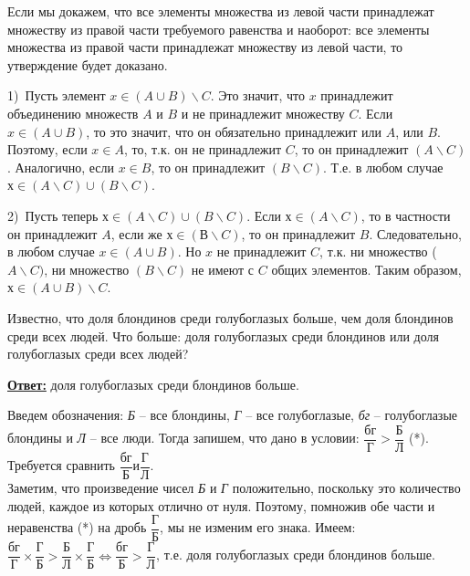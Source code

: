 \begin{prf}
Если мы докажем, что все элементы множества из левой части принадлежат множеству из правой части требуемого равенства и наоборот: все элементы множества из правой части принадлежат множеству из левой части, то утверждение будет доказано.

1)~Пусть элемент $x \in (A \cup B) \backslash C$. Это значит, что $x$ принадлежит объединению множеств $A$ и $B$ и не принадлежит множеству $C$. Если $x \in (A \cup B)$, то это значит, что он обязательно принадлежит или $A$, или $B$. Поэтому, если $x \in A$, то, т.к. он не принадлежит $C$, то он принадлежит $(A \backslash C)$. Аналогично, если $x \in B$, то он принадлежит $(B \backslash C)$. Т.е. в любом случае $х \in (A \backslash C) \cup (B \backslash C)$.

2)~Пусть теперь $х \in (A \backslash C) \cup (B \backslash C)$. Если $х \in (A \backslash C)$, то в частности он принадлежит $A$, если же $х \in (В \backslash C)$, то он принадлежит $B$. Следовательно, в любом случае $x \in (A \cup B)$. Но $x$ не принадлежит $C$, т.к. ни множество ($A \backslash C)$, ни множество $(B \backslash C)$ не имеют с $C$ общих элементов. Таким образом, $х \in (A \cup B) \backslash C$. 
\end{prf}

\begin{thm} 
Известно, что доля блондинов среди голубоглазых больше, чем доля блондинов среди всех людей. Что больше: доля голубоглазых среди блондинов или доля голубоглазых среди всех людей?
\end{thm}
\par
\textbf{\underline{Ответ:}} доля голубоглазых среди блондинов больше.

\begin{prf}
Введем обозначения: \textit{Б} – все блондины, \textit{Г} – все голубоглазые, \textit{бг} – голубоглазые блондины и \textit{Л} – все люди. Тогда запишем, что дано в условии: $\dfrac{\textit{бг}}{\textit{Г}} > \dfrac{\textit{Б}}{\textit{Л}}$ (*). Требуется сравнить $\dfrac{\textit{бг}}{\textit{Б}} и \dfrac{\textit{Г}}{\textit{Л}}$. \\
Заметим, что произведение чисел \textit{Б} и \textit{Г} положительно, поскольку это количество людей, каждое из которых отлично от нуля. Поэтому, помножив обе части и неравенства (*) на дробь $\dfrac{\textit{Г}}{\textit{Б}}$, мы не изменим его знака. Имеем:
$\dfrac{\textit{бг}}{\textit{Г}} \times \dfrac{\textit{Г}}{\textit{Б}} > \dfrac{\textit{Б}}{\textit{Л}} \times \dfrac{\textit{Г}}{\textit{Б}} \Leftrightarrow \dfrac{\textit{бг}}{\textit{Б}} > \dfrac{\textit{Г}}{\textit{Л}}$, т.е. доля голубоглазых среди блондинов больше.
\end{prf}

